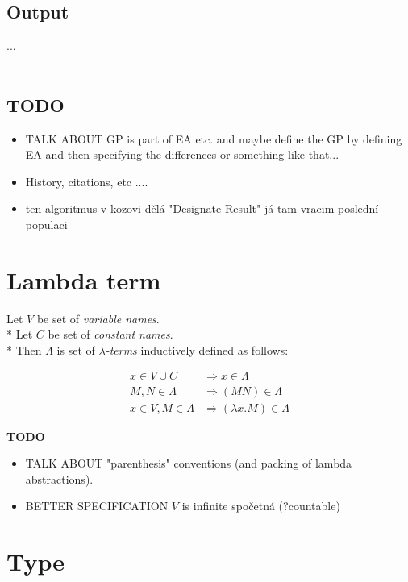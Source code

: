 \documentclass[12pt,a4paper]{report}
\newcommand{\lterms}{$\lambda$-terms\xspace}
\begin{document}
	\subsection{Output}


    ...
	\\\\
\subsection{TODO}
	\begin{itemize} 
		\item TALK ABOUT GP is part of EA etc. and maybe define the GP by defining EA and then
		      specifying the differences or something like that...    
		\item History, citations, etc ....
		\item ten algoritmus v kozovi dělá "Designate Result" já tam vracim poslední populaci
	\end{itemize}	  
		
\section{Lambda term}
\label{deflam}
	
	Let $V$ be set of {\it variable names}.  \\* 
	Let $C$ be set of {\it constant names}.	 \\*		
	Then $\Lambda$ is set of {\it \lterms} inductively defined as follows:
	
	\begin{align*}
		 x   \in V \cup C          &\Rightarrow     x   \in \Lambda \\
		 M,N \in \Lambda           &\Rightarrow ( M N ) \in \Lambda \\
		 x   \in V , M \in \Lambda &\Rightarrow ( \lambda x . M ) \in \Lambda 
	\end{align*} 

	\textbf{TODO} 
	\begin{itemize} 
		\item TALK ABOUT "parenthesis" conventions (and packing of lambda abstractions).
		\item BETTER SPECIFICATION $V$ is infinite spočetná (?countable)
	\end{itemize}
	
\section{Type}
\label{deftype}
\end{document}
